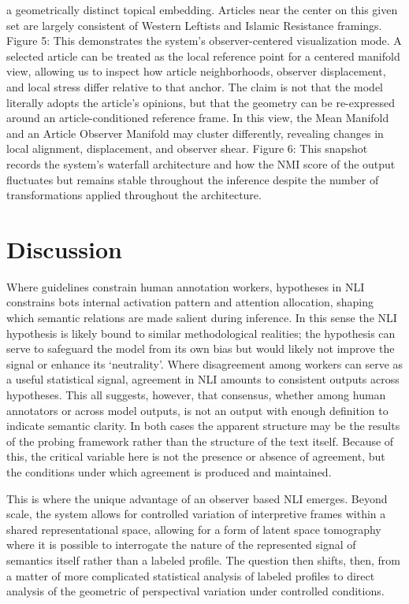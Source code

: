 a geometrically distinct topical embedding. Articles near the center on this given set are largely
consistent of Western Leftists and Islamic Resistance framings.
Figure 5: This demonstrates the system's observer-centered visualization mode. A selected
article can be treated as the local reference point for a centered manifold view, allowing us to
inspect how article neighborhoods, observer displacement, and local stress differ relative to that
anchor. The claim is not that the model literally adopts the article's opinions, but that the
geometry can be re-expressed around an article-conditioned reference frame. In this view, the
Mean Manifold and an Article Observer Manifold may cluster differently, revealing changes in
local alignment, displacement, and observer shear.
Figure 6: This snapshot records the system's waterfall architecture and how the NMI score of the
output fluctuates but remains stable throughout the inference despite the number of
transformations applied throughout the architecture.


\section{Discussion}

Where guidelines constrain human annotation workers, hypotheses in NLI constrains bots internal activation pattern and attention allocation, shaping which semantic relations are made salient during inference. In this sense the NLI hypothesis is likely bound to similar methodological realities; the hypothesis can serve to safeguard the model from its own bias but would likely not improve the signal or enhance its `neutrality'. Where disagreement among workers can serve as a useful statistical signal, agreement in NLI amounts to consistent outputs across hypotheses. This all suggests, however, that consensus, whether among human annotators or across model outputs, is not an output with enough definition to indicate semantic clarity. In both cases the apparent structure may be the results of the probing framework rather than the structure of the text itself. Because of this, the critical variable here is not the presence or absence of agreement, but the conditions under which agreement is produced and maintained.

This is where the unique advantage of an observer based NLI emerges. Beyond scale, the system allows for controlled variation of interpretive frames within a shared representational space, allowing for a form of latent space tomography where it is possible to interrogate the nature of the represented signal of semantics itself rather than a labeled profile. The question then shifts, then, from a matter of more complicated statistical analysis of labeled profiles to direct analysis of the geometric of perspectival variation under controlled conditions.

